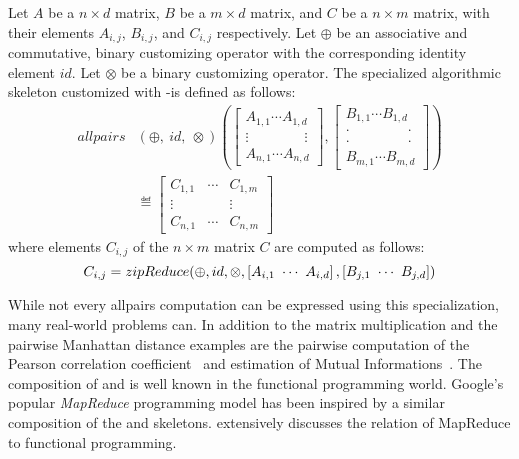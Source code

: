 \begin{definition}
  \label{def:allpairs:specialized}
  Let $A$ be a $n\times d$ matrix, $B$ be a $m\times d$ matrix, and $C$ be a $n\times m$ matrix, with their elements $A_{i,j}$, $B_{i,j}$, and $C_{i,j}$ respectively.
  Let $\oplus$ be an associative and commutative, binary customizing operator with the corresponding identity element $id$.
  Let $\otimes$ be a binary customizing operator.
  The specialized algorithmic skeleton \allpairs customized with \zip-\reduce is defined as follows:
  \begin{equation*}
    \begin{split}
    allpairs&(\oplus,\ id,\ \otimes)\left(%
      \left[ \begin{array}{c} A_{1,1} \cdots A_{1,d}\\[.25em] \vdots \hspace{4em} \vdots\\[.25em] A_{n,1} \cdots A_{n,d} \end{array}\right], %
      \left[ \begin{array}{c} B_{1,1} \cdots B_{1,d}\\[-.25em] \cdot \hspace{4em} \cdot\\[-.75em] \cdot \hspace{4em} \cdot\\[-.25em] B_{m,1} \cdots B_{m,d} \end{array}\right]%
      \right)\\
    &\eqdef \left[ \begin{array}{ccc} C_{1,1} & \cdots & C_{1,m}\\[.25em] \vdots & & \vdots\\[.25em] C_{n,1} & \cdots & C_{n,m} \end{array} \right]
    \end{split}
  \end{equation*}
  where elements $C_{i,j}$ of the $n\times m$ matrix $C$ are computed as follows:
  \[
    C_{i,j} = zipReduce(\oplus, id, \otimes, \left[A_{i,1}\ \cdots\ A_{i,d}\right], \left[B_{j,1}\ \cdots\ B_{j,d}\right])
  \]
\end{definition}


While not every allpairs computation can be expressed using this specialization, many real-world problems can.
In addition to the matrix multiplication and the pairwise Manhattan distance examples are the pairwise computation of the Pearson correlation coefficient~\cite{ChangDeQuRo2009} and estimation of Mutual Informations~\cite{DaubStSeKl2004}.
The composition of \zip and \reduce is well known in the functional programming world.
Google's popular \emph{MapReduce} programming model has been inspired by a similar composition of the \map and \reduce skeletons.
\cite{Laemmel2007} extensively discusses the relation of MapReduce to functional programming.


